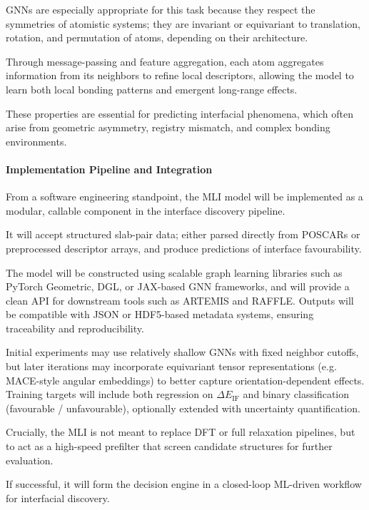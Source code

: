 
GNNs are especially appropriate for this task because they respect the symmetries of atomistic systems; they are
invariant or equivariant to translation, rotation, and permutation of atoms, depending on their architecture.

Through message-passing and feature aggregation, each atom aggregates information from its neighbors to refine local
descriptors, allowing the model to learn both local bonding patterns and emergent long-range effects.

These properties are essential for predicting interfacial phenomena, which often arise from geometric asymmetry,
registry mismatch, and complex bonding environments.


\paragraph{Implementation Pipeline and Integration}

From a software engineering standpoint, the MLI model will be implemented as a modular, callable component in the
interface discovery pipeline.

It will accept structured slab-pair data; either parsed directly from POSCARs or preprocessed descriptor arrays, and
produce predictions of interface favourability.

The model will be constructed using scalable graph learning libraries such as PyTorch Geometric, DGL, or JAX-based GNN
frameworks, and will provide a clean API for downstream tools such as ARTEMIS and RAFFLE. Outputs will be compatible
with JSON or HDF5-based metadata systems, ensuring traceability and reproducibility.


Initial experiments may use relatively shallow GNNs with fixed neighbor cutoffs, but later iterations may incorporate
equivariant tensor representations (e.g. MACE-style angular embeddings) to better capture orientation-dependent effects.
Training targets will include both regression on \( \Delta E_\mathrm{IF} \) and binary classification
(favourable / unfavourable), optionally extended with uncertainty quantification.

Crucially, the MLI is not meant to replace DFT or full relaxation pipelines, but to act as a high-speed prefilter that
screen candidate structures for further evaluation.

If successful, it will form the decision engine in a closed-loop ML-driven workflow for interfacial discovery.

